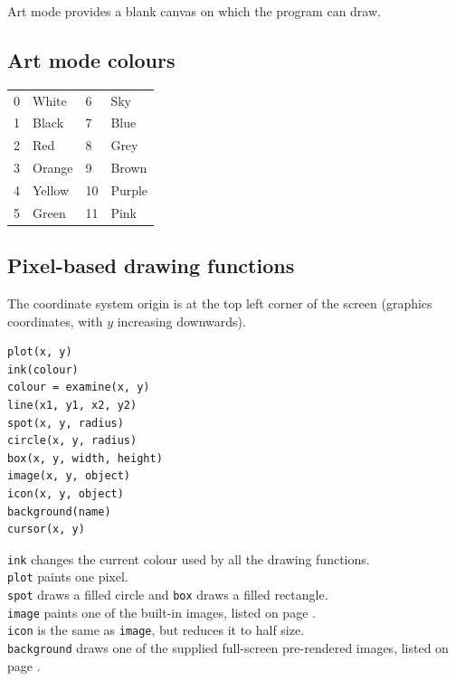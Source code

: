 \documentclass[12pt,a4paper,twoside]{article}
\renewcommand{\_}{\texttt{\symbol{95}}}
\begin{document}
Art mode provides a blank canvas on which the program can draw.

\subsection{Art mode colours}

\label{roboc:colours}
\begin{tabular}{|ll|ll|}
\hline
\rule{0mm}{4.5mm}%
0 & White   & 6  & Sky\\
1 & Black   & 7  & Blue\\
2 & Red     & 8  & Grey\\
3 & Orange  & 9  & Brown\\
4 & Yellow  & 10 & Purple\\
5 & Green   & 11 & Pink\\
\hline
\end{tabular}

% 
% 
% 
% 
% 

\subsection{Pixel-based drawing functions}

The coordinate system origin is at the top left corner of the
screen (graphics coordinates, with $y$ increasing downwards).

\begin{verbatim}
plot(x, y)
ink(colour)
colour = examine(x, y)
line(x1, y1, x2, y2)
spot(x, y, radius)
circle(x, y, radius)
box(x, y, width, height)
image(x, y, object)
icon(x, y, object)
background(name)
cursor(x, y)
\end{verbatim}

\verb^ink^ changes the current colour used by all the drawing
functions. \\
\verb^plot^ paints one pixel.\\
\verb^spot^ draws a filled circle and \verb^box^ draws a filled rectangle.\\
\verb^image^ paints one of the built-in images, listed on page
	\pageref{images}.\\
\verb^icon^ is the same as \verb^image^, but reduces it to half size.\\
\verb^background^ draws one of the supplied full-screen pre-rendered images,
	listed on page \pageref{backgrounds}.\\
\end{document}
